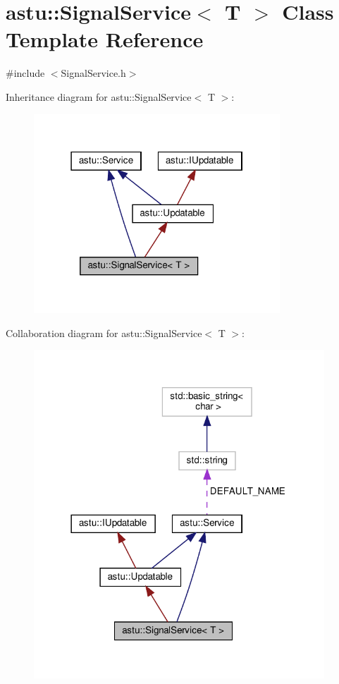 \hypertarget{classastu_1_1SignalService}{}\section{astu\+:\+:Signal\+Service$<$ T $>$ Class Template Reference}
\label{classastu_1_1SignalService}


{\ttfamily \#include $<$Signal\+Service.\+h$>$}



Inheritance diagram for astu\+:\+:Signal\+Service$<$ T $>$\+:\nopagebreak
\begin{figure}[H]
\begin{center}
\leavevmode
\includegraphics[width=262pt]{classastu_1_1SignalService__inherit__graph}
\end{center}
\end{figure}


Collaboration diagram for astu\+:\+:Signal\+Service$<$ T $>$\+:\nopagebreak
\begin{figure}[H]
\begin{center}
\leavevmode
\includegraphics[width=309pt]{classastu_1_1SignalService__coll__graph}
\end{center}
\end{figure}
